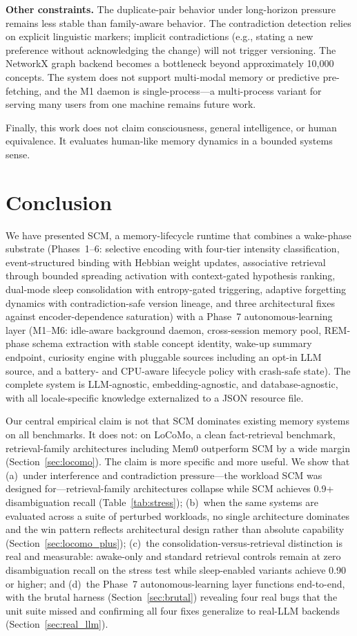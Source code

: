\documentclass[11pt,twocolumn]{article}
\begin{document}
\textbf{Other constraints.} The duplicate-pair behavior under long-horizon pressure remains less stable than family-aware behavior. The contradiction detection relies on explicit linguistic markers; implicit contradictions (e.g., stating a new preference without acknowledging the change) will not trigger versioning. The NetworkX graph backend becomes a bottleneck beyond approximately 10,000 concepts. The system does not support multi-modal memory or predictive pre-fetching, and the M1 daemon is single-process---a multi-process variant for serving many users from one machine remains future work.

Finally, this work does not claim consciousness, general intelligence, or human equivalence. It evaluates human-like memory dynamics in a bounded systems sense.

\section{Conclusion}

We have presented SCM, a memory-lifecycle runtime that combines a wake-phase substrate (Phases~1--6: selective encoding with four-tier intensity classification, event-structured binding with Hebbian weight updates, associative retrieval through bounded spreading activation with context-gated hypothesis ranking, dual-mode sleep consolidation with entropy-gated triggering, adaptive forgetting dynamics with contradiction-safe version lineage, and three architectural fixes against encoder-dependence saturation) with a Phase~7 autonomous-learning layer (M1--M6: idle-aware background daemon, cross-session memory pool, REM-phase schema extraction with stable concept identity, wake-up summary endpoint, curiosity engine with pluggable sources including an opt-in LLM source, and a battery- and CPU-aware lifecycle policy with crash-safe state). The complete system is LLM-agnostic, embedding-agnostic, and database-agnostic, with all locale-specific knowledge externalized to a JSON resource file.

Our central empirical claim is not that SCM dominates existing memory systems on all benchmarks. It does not: on LoCoMo, a clean fact-retrieval benchmark, retrieval-family architectures including Mem0 outperform SCM by a wide margin (Section~\ref{sec:locomo}). The claim is more specific and more useful. We show that (a)~under interference and contradiction pressure---the workload SCM was designed for---retrieval-family architectures collapse while SCM achieves 0.9+ disambiguation recall (Table~\ref{tab:stress}); (b)~when the same systems are evaluated across a suite of perturbed workloads, no single architecture dominates and the win pattern reflects architectural design rather than absolute capability (Section~\ref{sec:locomo_plus}); (c)~the consolidation-versus-retrieval distinction is real and measurable: awake-only and standard retrieval controls remain at zero disambiguation recall on the stress test while sleep-enabled variants achieve 0.90 or higher; and (d)~the Phase~7 autonomous-learning layer functions end-to-end, with the brutal harness (Section~\ref{sec:brutal}) revealing four real bugs that the unit suite missed and confirming all four fixes generalize to real-LLM backends (Section~\ref{sec:real_llm}).
\end{document}
